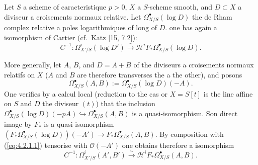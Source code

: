 \documentclass[12pt,a4paper]{article}
\theoremstyle{plain}
\theoremstyle{definition}
\theoremstyle{remark}
\newcommand{\cO}{\mathcal{O}}
\begin{document}
\subsubsection{}

Let $S$ a scheme of caracteristique $p > 0$, $X$ a $S$-scheme smooth, and $D \subset X$ a diviseur a croisements normaux relative. Let $\Omega^{\bullet}_{X/S}(\log D)$ the de Rham complex relative a poles logarithmiques of long of $D$. one has again a isomorphism of Cartier (cf.~Katz [15, 7.2]):
\begin{equation}\label{eq:4.2.1.1}
C^{-1}: \Omega^i_{X'/S}(\log D') \xrightarrow{\sim} \mathscr{H}^i F_* \Omega^{\bullet}_{X/S}(\log D).
\end{equation}

More generally, let $A$, $B$, and $D = A + B$ of the diviseurs a croisements normaux relatifs on $X$ ($A$ and $B$ are therefore transverses the a the other), and posons
\begin{equation}\label{eq:4.2.1.2}
\Omega^{\bullet}_{X/S}(A, B) := \Omega^{\bullet}_{X/S}(\log D)(-A).
\end{equation}
One verifies by a calcul local (reduction to the cas or $X = S[t]$ is the line affine on $S$ and $D$ the diviseur $(t)$) that the inclusion $\Omega^{\bullet}_{X/S}(\log D)(-pA) \hookrightarrow \Omega^{\bullet}_{X/S}(A, B)$ is a quasi-isomorphism. Son direct image by $F_*$ is a quasi-isomorphism $(F_* \Omega^{\bullet}_{X/S}(\log D))(-A') \to F_* \Omega^{\bullet}_{X/S}(A, B)$. By composition with (\ref{eq:4.2.1.1}) tensorise with $\cO(-A')$ one obtains therefore a isomorphism
\begin{equation}\label{eq:4.2.1.3}
C^{-1}: \Omega^i_{X'/S}(A', B') \xrightarrow{\sim} \mathscr{H}^i F_* \Omega^{\bullet}_{X/S}(A, B).
\end{equation}
\end{document}
